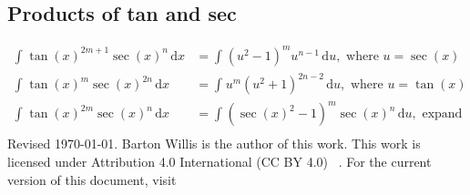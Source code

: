 \documentclass[letterpaper,landscape,9pt,fleqn]{extarticle}
\newcommand{\dd}{\mathrm{d}}
\newcommand{\intl}[4]{\displaystyle\int^{#2}_{#1}{#3}{\,\dd #4}}
\begin{document}
\begin{multicols*}{4}
 \section*{Products of tan and sec}
 \begin{align*}
  \intl{}{}{\tan(x)^{2m+1} \sec(x)^n}{x} &= \intl{}{}{(u^2-1)^{m} u^{n-1}}{u}, \text{ where } u = \sec(x)\\
  \intl{}{}{\tan(x)^{m} \sec(x)^{2n}}{x} &= \intl{}{}{u^m (u^2+1)^{2n-2}}{u}, \text{ where } u = \tan(x)\\
  \intl{}{}{\tan(x)^{2 m} \sec(x)^{n}}{x} &= \intl{}{}{(\sec(x)^2-1)^m \sec(x)^n}{u}, \text{ expand }\\ 
 \end{align*}                    
\vfill 
\noindent Revised \today. Barton Willis is the author of this work. This work is
licensed under Attribution 4.0 International (CC BY 4.0) \,  . For the current version of
this document, visit \,  

\end{multicols*}
\end{document}
